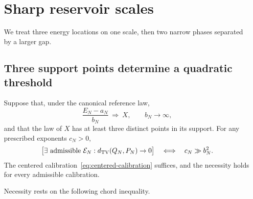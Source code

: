 \section{Sharp reservoir scales}
\label{sec:thresholds}

We treat three energy locations on one scale, then two narrow phases
separated by a larger gap.

\subsection{Three support points determine a quadratic threshold}

\begin{theorem}
\label{thm:three-support}
Suppose that, under the canonical reference law,
\begin{equation}
 \frac{E_N-a_N}{b_N}\ \Rightarrow\ X,
 \qquad b_N\to\infty,
 \label{eq:weak-energy-limit}
\end{equation}
and that the law of $X$ has at least three distinct points in its support.
For any prescribed exponents $c_N>0$,
\begin{equation}
 \bigl[\exists\hbox{ admissible }\mathcal E_N:
       d_{\mathrm{TV}}(Q_N,P_N)\to0\bigr]
 \quad\Longleftrightarrow\quad c_N\gg b_N^2.
 \label{eq:three-support-threshold}
\end{equation}
The centered calibration~\eqref{eq:centered-calibration} suffices, and
the necessity holds for every admissible calibration.
\end{theorem}

Necessity rests on the following chord inequality.

